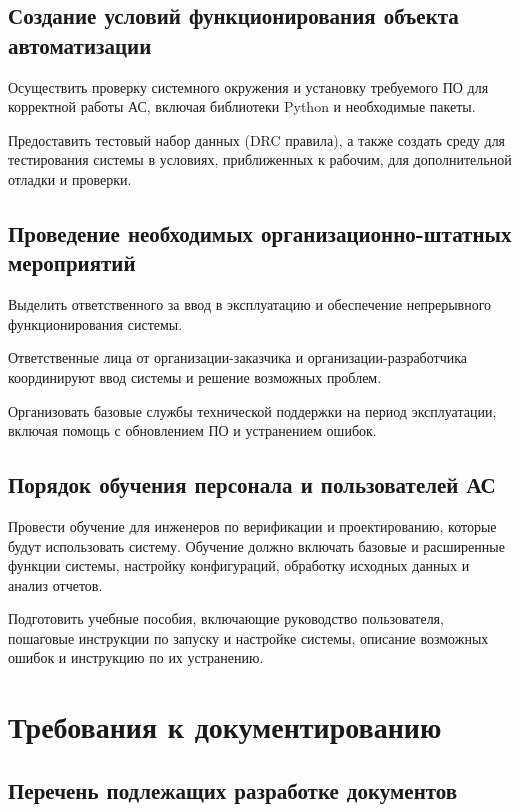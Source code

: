 \subsection{Создание условий функционирования объекта автоматизации}

Осуществить проверку системного окружения
и установку требуемого ПО для корректной работы АС,
включая библиотеки Python и необходимые пакеты.

Предоставить тестовый набор данных (DRC правила),
а также создать среду для тестирования системы в условиях,
приближенных к рабочим, для дополнительной отладки и проверки.

\subsection{Проведение необходимых организационно-штатных мероприятий}

Выделить ответственного за ввод в эксплуатацию
и обеспечение непрерывного функционирования системы.

Ответственные лица от организации-заказчика
и организации-разработчика координируют ввод системы
и решение возможных проблем.

Организовать базовые службы технической поддержки на период эксплуатации,
включая помощь с обновлением ПО и устранением ошибок.

\subsection{Порядок обучения персонала и пользователей АС}

Провести обучение для инженеров по верификации и проектированию,
которые будут использовать систему.
Обучение должно включать базовые и расширенные функции системы,
настройку конфигураций, обработку исходных данных и анализ отчетов.

Подготовить учебные пособия, включающие руководство пользователя,
пошаговые инструкции по запуску и настройке системы,
описание возможных ошибок и инструкцию по их устранению.

\section{Требования к документированию}

\subsection{Перечень подлежащих разработке документов}

